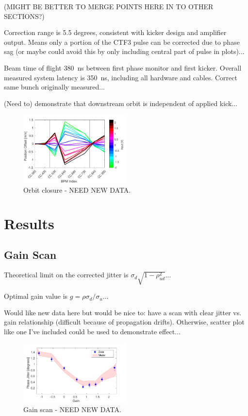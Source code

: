 \documentclass[%
 reprint,
 amsmath,amssymb,
 aps,
]{revtex4-1}
\begin{document}
(MIGHT BE BETTER TO MERGE POINTS HERE IN TO OTHER SECTIONS?)

Correction range is 5.5 degrees, consistent with kicker design and amplifier output. Means only a portion of the CTF3 pulse can be corrected due to phase sag (or maybe could avoid this by only including central part of pulse in plots)...

Beam time of flight 380~ns between first phase monitor and first kicker. Overall measured system latency is 350~ns, including all hardware and cables. Correct same bunch originally measured...

(Need to) demonstrate that downstream orbit is independent of applied kick...

\begin{figure}
\includegraphics[width=0.5\textwidth]{figs/orbClos}%
\caption{\label{fig:orbClos}Orbit closure - NEED NEW DATA.}
\end{figure}


\section{\label{s:results}Results}

\subsection{\label{ss:gScan}Gain Scan}

Theoretical limit on the corrected jitter is \(\sigma_d \sqrt{1-\rho_{ud}^2}\)...

Optimal gain value is \(g = \rho \sigma_d/\sigma_u\)...

Would like new data here but would be nice to: have a scan with clear jitter vs. gain relationship (difficult because of propagation drifts). Otherwise, scatter plot like one I've included could be used to demonstrate effect...

\begin{figure}
\includegraphics[width=0.5\textwidth]{figs/gScan}%
\caption{\label{fig:gScan}Gain scan - NEED NEW DATA.}
\end{figure}
\end{document}
